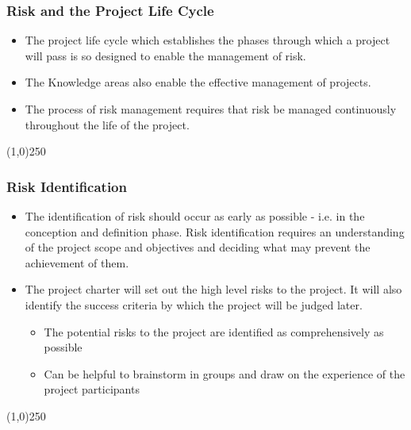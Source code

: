 \begin{frame}
\frametitle{Risk and the Project Life Cycle}
\begin{itemize}
\item The project life cycle which establishes the phases through which a project will pass is so designed to enable the management of risk. 
\item The Knowledge areas also enable the effective management of projects. 
\item The process of risk management requires that risk be managed continuously throughout the life of the project.
\end{itemize}
\end{frame}\begin{center}\line(1,0){250}\end{center}





\begin{frame}
\frametitle{Risk Identification}
\begin{itemize}
\item The identification of risk should occur as early as possible - i.e. in the conception and definition phase. Risk identification requires an understanding of the project scope and objectives and deciding what may prevent the achievement of them.
\item The project charter will set out the high level risks to the project. It will also identify the success criteria by which the project will be judged later.
\begin{itemize}
	\item The potential risks to the project are identified as comprehensively as possible
\item Can be helpful to brainstorm in groups and draw on the experience of the project participants
\end{itemize}
\end{itemize}
\end{frame}\begin{center}\line(1,0){250}\end{center}






